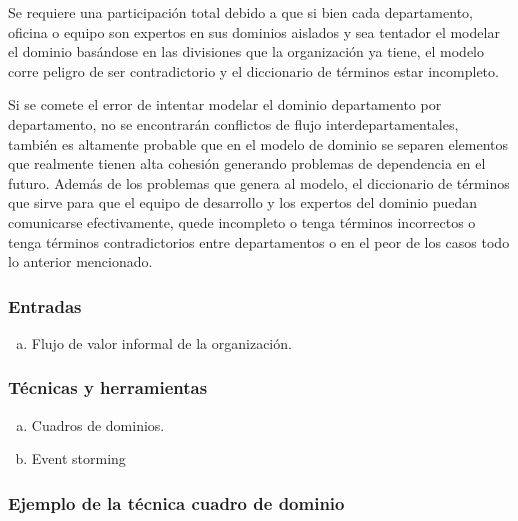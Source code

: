 Se requiere una participación total debido a que si bien cada departamento, oficina o equipo son expertos
en sus dominios aislados y sea tentador el modelar el dominio basándose en las divisiones que la organización ya
tiene, el modelo corre peligro de ser contradictorio y el diccionario de términos estar incompleto.

Si se comete el error de intentar modelar el dominio departamento por departamento, no se encontrarán
conflictos de flujo interdepartamentales, también es altamente probable que en el modelo de dominio
se separen elementos que realmente tienen alta cohesión generando problemas de dependencia en el futuro.
Además de los problemas que genera al modelo, el diccionario de términos que sirve para que el equipo
de desarrollo y los expertos del dominio puedan comunicarse efectivamente, quede incompleto o tenga
términos incorrectos o tenga términos contradictorios entre departamentos o en el peor de los casos
todo lo anterior mencionado.

\subsubsection*{Entradas}
\begin{enumerate}[a.]
	\item Flujo de valor informal de la organización.
\end{enumerate}

\subsubsection*{Técnicas y herramientas}
\begin{enumerate}[a.]
	\item Cuadros de dominios.
  \item Event storming
\end{enumerate}

\subsubsection*{Ejemplo de la técnica cuadro de dominio}
\vspace{1em}

